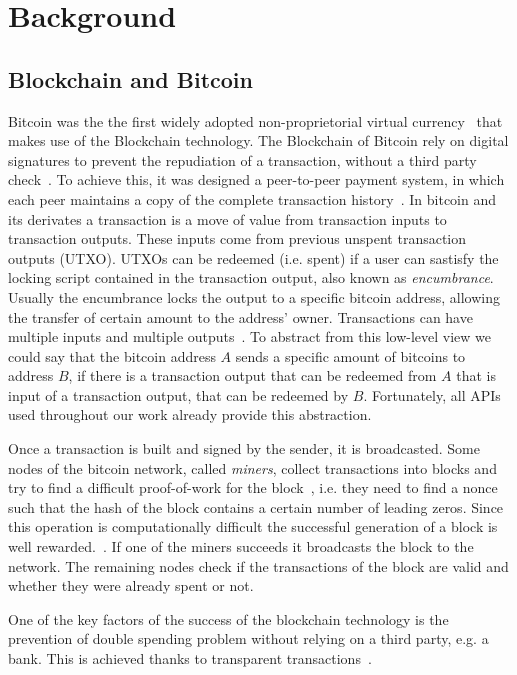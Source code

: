 \section{Background} \label{background}
\subsection{Blockchain and Bitcoin}
Bitcoin was the the first widely adopted non-proprietorial virtual
currency~\cite{bib:respCrypto} that makes use of the
Blockchain technology. The Blockchain of Bitcoin rely on digital
signatures to prevent the repudiation of a transaction, without a third
party check~\cite{bib:anonAnalysis}.
To achieve this, it was designed a peer-to-peer payment system,
in which each peer maintains a copy of the complete transaction
history~\cite{bib:fistful}. 
In bitcoin and its derivates a transaction is a move of value 
from transaction inputs to transaction outputs.
These inputs come from previous unspent transaction outputs (UTXO).
UTXOs can be redeemed (i.e. spent) if a user can sastisfy the locking
script contained in the transaction output, also known as \emph{encumbrance}.
Usually the encumbrance locks the output to a specific bitcoin address,
allowing the transfer of certain amount to the address' owner.
Transactions can have multiple inputs and multiple 
outputs~\cite{bib:bitcoin:mastering}. 
To abstract from this low-level view we could say that the bitcoin
address $A$ sends a specific amount of bitcoins to address $B$, 
if there is a transaction output that can be redeemed from $A$ that
is input of a transaction output, that can be redeemed by $B$.
Fortunately, all APIs used throughout our work already provide this
abstraction.

Once a transaction is built and signed by the
sender, it is broadcasted. Some nodes of the bitcoin network, called
\textit{miners}, collect transactions into blocks and try to find a difficult
proof-of-work for the block~\cite{bib:hashcash, bib:pricing}, i.e. they
need to find a nonce such that the hash of the block contains a certain number
of leading zeros. Since this operation is
computationally difficult the successful generation of a block is well
rewarded.~\cite{bib:satoshi}. If one of the miners succeeds it broadcasts the
block to the network. The remaining nodes check if the transactions of the
block are valid and whether they were already spent or not. 

One of the key factors of the success of the blockchain technology
is the prevention of double spending problem without relying on a third party,
e.g. a bank. This is achieved thanks to transparent
transactions~\cite{bib:bitcoinbeyond}.

